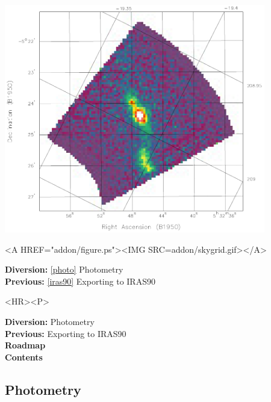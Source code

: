 \documentclass[11pt]{article}
\newenvironment{latexonly}{}{}
\newcommand{\htmlref}[2]{#1}
\newcommand{\xlabel}[1]{}
\begin{document}
\begin{latexonly}
\begin{center}
\leavevmode\includegraphics[height=100mm]{sc1_figure}
\end{center}
\end{latexonly}
\begin{htmlonly}
\begin{rawhtml} <A HREF="addon/figure.ps"><IMG SRC=addon/skygrid.gif></A> \end{rawhtml}
\end{htmlonly}

\begin{latexonly}
{\bf Diversion:} \ref{photo} Photometry\\
{\bf Previous:} \ref{iras90} Exporting to IRAS90\\
\end{latexonly}

\begin{htmlonly}
\begin{rawhtml} <HR><P> \end{rawhtml}
{\bf \htmlref{Diversion:}{photo}} Photometry\\
{\bf \htmlref{Previous:}{iras90}} Exporting to IRAS90\\
{\bf \htmlref{Roadmap}{roadmap}}\\
{\bf \htmlref{Contents}{stardoccontents}}\\
\end{htmlonly}


\subsection{\label{photo}\xlabel{photo}Photometry}
\end{document}
